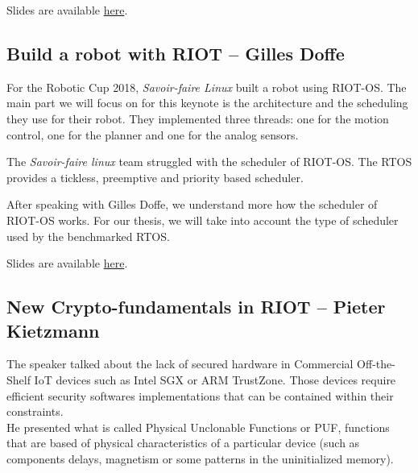 \documentclass[journal, a4paper]{../IEEEtran}
\begin{document}

Slides are available \href{http://summit.riot-os.org/2018/wp-content/uploads/sites/10/2018/09/1_3-Christian-Asmuess-CoAP-RD.pdf}{here}.

\subsection{Build a robot with RIOT -- Gilles Doffe}
For the Robotic Cup 2018, \textit{Savoir-faire Linux} built a robot using RIOT-OS.
The main part we will focus on for this keynote is the architecture and the scheduling they use for their robot.
They implemented three threads: one for the motion control, one for the planner and one for the analog sensors.
 
The \textit{Savoir-faire linux} team struggled with the scheduler of RIOT-OS. 
The RTOS provides a tickless, preemptive and priority based scheduler.

After speaking with Gilles Doffe, we understand more how the scheduler of RIOT-OS works.
For our thesis, we will take into account the type of scheduler used by the benchmarked RTOS.



Slides are available \href{http://summit.riot-os.org/2018/wp-content/uploads/sites/10/2018/09/2_1-Gille-Doffe-RIOT-Robot.pdf}{here}.

\subsection{New Crypto-fundamentals in RIOT -- Pieter Kietzmann}

The speaker talked about the lack of secured hardware in Commercial Off-the-Shelf IoT devices such as Intel SGX or ARM TrustZone.
Those devices require efficient security softwares implementations that can be contained within their constraints.\\

He presented what is called Physical Unclonable Functions or PUF, 
    functions that are based of physical characteristics of a particular device (such as components delays, magnetism or some patterns in the uninitialized memory).
\end{document}
